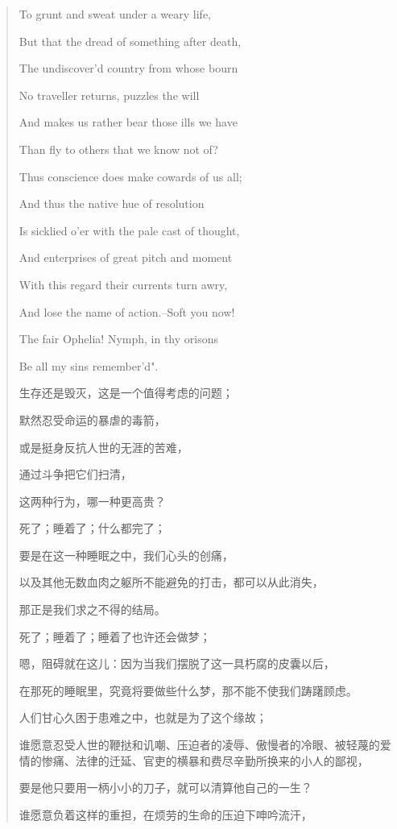 \begin{quotation}
    To grunt and sweat under a weary life,

    But that the dread of something after death,

    The undiscover'd country from whose bourn

    No traveller returns, puzzles the will

    And makes us rather bear those ills we have

    Than fly to others that we know not of?

    Thus conscience does make cowards of us all;

    And thus the native hue of resolution

    Is sicklied o'er with the pale cast of thought,

    And enterprises of great pitch and moment

    With this regard their currents turn awry,

    And lose the name of action.--Soft you now!

    The fair Ophelia! Nymph, in thy orisons

    Be all my sins remember'd".


    生存还是毁灭，这是一个值得考虑的问题；

    默然忍受命运的暴虐的毒箭，

    或是挺身反抗人世的无涯的苦难，

    通过斗争把它们扫清，

    这两种行为，哪一种更高贵？

    死了；睡着了；什么都完了；

    要是在这一种睡眠之中，我们心头的创痛，

    以及其他无数血肉之躯所不能避免的打击，都可以从此消失，

    那正是我们求之不得的结局。

    死了；睡着了；睡着了也许还会做梦；

    嗯，阻碍就在这儿：因为当我们摆脱了这一具朽腐的皮囊以后，

    在那死的睡眠里，究竟将要做些什么梦，那不能不使我们踌躇顾虑。

    人们甘心久困于患难之中，也就是为了这个缘故；

    谁愿意忍受人世的鞭挞和讥嘲、压迫者的凌辱、傲慢者的冷眼、被轻蔑的爱情的惨痛、法律的迁延、官吏的横暴和费尽辛勤所换来的小人的鄙视，

    要是他只要用一柄小小的刀子，就可以清算他自己的一生？

    谁愿意负着这样的重担，在烦劳的生命的压迫下呻吟流汗，


\end{quotation}
